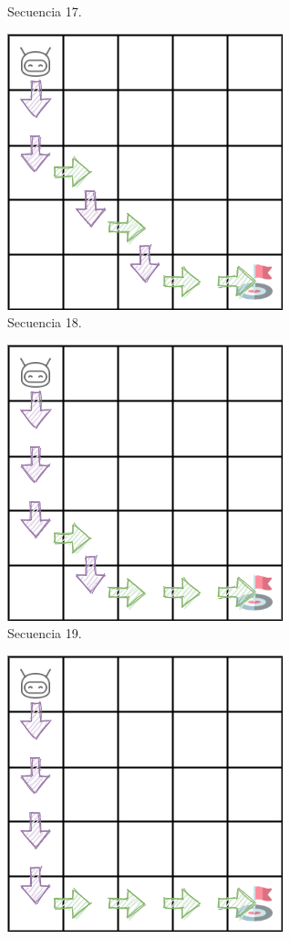 \begin{figure}
{\begin{subfigure}{.35\textwidth}
        \caption{Secuencia 17.}
        \label{fig:seq17}
    \end{subfigure}%
    \begin{subfigure}{.35\textwidth}
        \centering
        \includegraphics[scale=0.4]{cap5_experimentacion/images/dim5_lr0.01_ep0.3_409.png}
        \caption{Secuencia 18.}
        \label{fig:seq18}
    \end{subfigure}
    \begin{subfigure}{.35\textwidth}
        \centering
        \includegraphics[scale=0.4]{cap5_experimentacion/images/dim5_lr0.01_ep0.5_6_1.png}
        \caption{Secuencia 19.}
        \label{fig:seq19}
    \end{subfigure}%
    \begin{subfigure}{.35\textwidth}
        \centering
        \includegraphics[scale=0.4]{cap5_experimentacion/images/dim5_lr0.01_ep0.3_47.png}

\end{subfigure}}
\end{figure}

